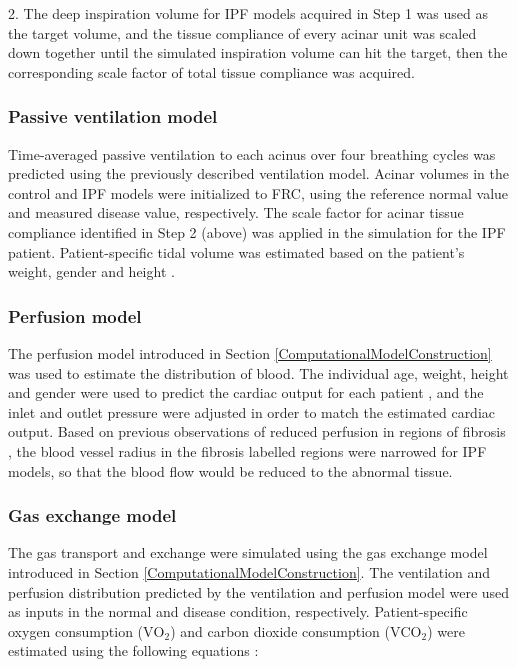2. The deep inspiration volume for IPF models acquired in Step 1 was used as the target volume, and the tissue compliance of every acinar unit was scaled down together until the simulated inspiration volume can hit the target, then the corresponding scale factor of total tissue compliance was acquired.

\subsubsection{Passive ventilation model}
Time-averaged passive ventilation to each acinus over four breathing cycles was predicted using the previously described ventilation model. Acinar volumes in the control and IPF models were initialized to FRC, using the reference normal value and measured disease value, respectively. The scale factor for acinar tissue compliance identified in Step 2 (above) was applied in the simulation for the IPF patient. Patient-specific tidal volume was estimated based on the patient's weight, gender and height \citep{gilbert1972changes, pelosi1998effects}.

\subsubsection{Perfusion model}
The perfusion model introduced in Section \ref{ComputationalModelConstruction} was used to estimate the distribution of blood. The individual age, weight, height and gender were used to predict the cardiac output for each patient \citep{brandfonbrener1955changes, miyamura1973maximum, stelfox2006hemodynamic}, and the inlet and outlet pressure were adjusted in order to match the estimated cardiac output. Based on previous observations of reduced perfusion in regions of fibrosis \citep{crystal1976idiopathic, strickland1993cause, plantier2018physiology}, the blood vessel radius in the fibrosis labelled regions were narrowed for IPF models, so that the blood flow would be reduced to the abnormal tissue.

\subsubsection{Gas exchange model}
The gas transport and exchange were simulated using the gas exchange model introduced in Section \ref{ComputationalModelConstruction}. The ventilation and perfusion distribution predicted by the ventilation and perfusion model were used as inputs in the normal and disease condition, respectively. Patient-specific oxygen consumption ($\mathrm{VO_2}$) and carbon dioxide consumption ($\mathrm{VCO_2}$) were estimated using the following equations \citep{kwan2004standard, coelho2013estimation}:

